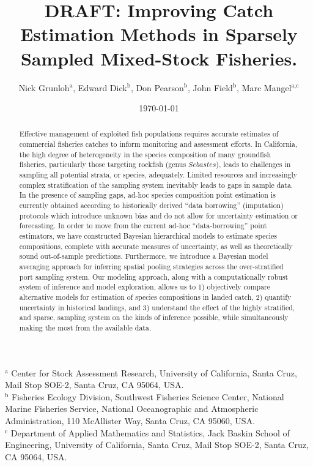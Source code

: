 \documentclass[12pt]{article}
\begin{document}
%
\title{DRAFT: Improving Catch Estimation Methods in Sparsely Sampled Mixed-Stock Fisheries.}
\author{Nick Grunloh$^\text{a}$, Edward Dick$^\text{b}$, Don Pearson$^\text{b}$, John Field$^\text{b}$, Marc Mangel$^\text{a,c}$}
\date{\today}
\maketitle
\noindent
$^\text{a}$ Center for Stock Assessment Research, University of California, Santa Cruz, Mail Stop SOE-2, Santa Cruz, CA 95064, USA.\\
$^\text{b}$ Fisheries Ecology Division, Southwest Fisheries Science Center, National Marine Fisheries Service, National Oceanographic and Atmospheric Administration, 110 McAllister Way, Santa Cruz, CA 95060, USA.\\
$^\text{c}$ Department of Applied Mathematics and Statistics, Jack Baskin School of Engineering, University of California, Santa Cruz, Mail Stop SOE-2, Santa Cruz, CA 95064, USA.

%
\begin{abstract}
Effective management of exploited fish populations requires accurate
estimates of commercial fisheries catches to inform monitoring and
assessment efforts. In California, the high degree of heterogeneity in
the species composition of many groundfish fisheries, particularly those
targeting rockfish (genus \(Sebastes\)), leads to challenges in sampling
all potential strata, or species, adequately. Limited resources and
increasingly complex stratification of the sampling system inevitably
leads to gaps in sample data. In the presence of sampling gaps, ad-hoc
species composition point estimation is currently obtained according to
historically derived ``data borrowing'' (imputation) protocols which 
introduce unknown bias and do not allow for uncertainty estimation or 
forecasting. In order to move from the current ad-hoc ``data-borrowing'' point 
estimators, we have constructed Bayesian hierarchical models to estimate 
species compositions, complete with accurate measures of uncertainty, as well 
as theoretically sound out-of-sample predictions. Furthermore, we 
introduce a Bayesian model averaging approach for inferring spatial 
pooling strategies across the over-stratified port sampling system. Our 
modeling approach, along with a computationally robust system of inference 
and model exploration, allows us to 1) objectively compare alternative models 
for estimation of species compositions in landed catch, 2) quantify uncertainty 
in historical landings, and 3) understand the effect of the highly stratified, 
and sparse, sampling system on the kinds of inference possible, 
while simultaneously making the most from the available data.
\end{abstract}
\end{document}
